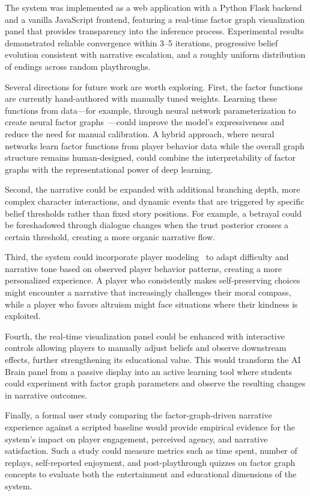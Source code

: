 \documentclass[journal]{IEEEtran}
\begin{document}
The system was implemented as a web application with a Python Flask backend and a vanilla JavaScript frontend, featuring a real-time factor graph visualization panel that provides transparency into the inference process. Experimental results demonstrated reliable convergence within 3--5 iterations, progressive belief evolution consistent with narrative escalation, and a roughly uniform distribution of endings across random playthroughs.

Several directions for future work are worth exploring. First, the factor functions are currently hand-authored with manually tuned weights. Learning these functions from data---for example, through neural network parameterization to create neural factor graphs~\cite{ref9}---could improve the model's expressiveness and reduce the need for manual calibration. A hybrid approach, where neural networks learn factor functions from player behavior data while the overall graph structure remains human-designed, could combine the interpretability of factor graphs with the representational power of deep learning.

Second, the narrative could be expanded with additional branching depth, more complex character interactions, and dynamic events that are triggered by specific belief thresholds rather than fixed story positions. For example, a betrayal could be foreshadowed through dialogue changes when the trust posterior crosses a certain threshold, creating a more organic narrative flow.

Third, the system could incorporate player modeling~\cite{ref8} to adapt difficulty and narrative tone based on observed player behavior patterns, creating a more personalized experience. A player who consistently makes self-preserving choices might encounter a narrative that increasingly challenges their moral compass, while a player who favors altruism might face situations where their kindness is exploited.

Fourth, the real-time visualization panel could be enhanced with interactive controls allowing players to manually adjust beliefs and observe downstream effects, further strengthening its educational value. This would transform the AI Brain panel from a passive display into an active learning tool where students could experiment with factor graph parameters and observe the resulting changes in narrative outcomes.

Finally, a formal user study comparing the factor-graph-driven narrative experience against a scripted baseline would provide empirical evidence for the system's impact on player engagement, perceived agency, and narrative satisfaction. Such a study could measure metrics such as time spent, number of replays, self-reported enjoyment, and post-playthrough quizzes on factor graph concepts to evaluate both the entertainment and educational dimensions of the system.
\end{document}
